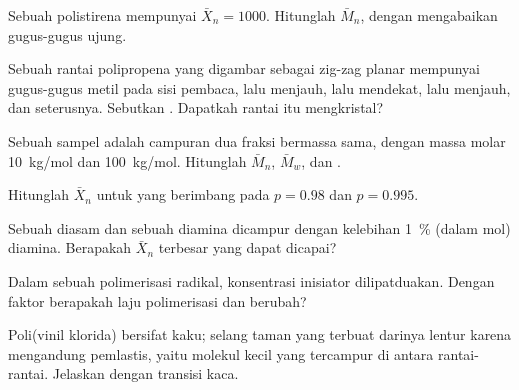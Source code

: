 \begin{exercise}[$\star$]\label{exo:b2:polymer-synthesis:3}
Sebuah polistirena mempunyai $\bar X_n = 1000$. Hitunglah $\bar M_n$, dengan mengabaikan gugus-gugus ujung.
\end{exercise}

\begin{exercise}[$\star$]\label{exo:b2:polymer-synthesis:4}
Sebuah rantai polipropena yang digambar sebagai zig-zag planar mempunyai
gugus-gugus metil pada sisi pembaca, lalu menjauh, lalu mendekat, lalu
menjauh, dan seterusnya. Sebutkan . Dapatkah rantai itu
mengkristal?
\end{exercise}

\begin{exercise}[$\star\star$]\label{exo:b2:polymer-synthesis:5}
Sebuah sampel adalah campuran dua fraksi bermassa sama, dengan massa molar
\qty{10}{kg/mol} dan
\qty{100}{kg/mol}. Hitunglah $\bar M_n$, $\bar M_w$, dan .
\end{exercise}

\begin{exercise}[$\star\star$]\label{exo:b2:polymer-synthesis:6}
Hitunglah $\bar X_n$ untuk  yang berimbang pada $p = 0.98$ dan $p = 0.995$.
\end{exercise}

\begin{exercise}[$\star\star$]\label{exo:b2:polymer-synthesis:7}
Sebuah diasam dan sebuah diamina dicampur dengan kelebihan 1~\% (dalam mol)
diamina. Berapakah $\bar X_n$ terbesar yang dapat dicapai?
\end{exercise}

\begin{exercise}[$\star\star$]\label{exo:b2:polymer-synthesis:8}
Dalam sebuah polimerisasi radikal, konsentrasi inisiator dilipatduakan.
Dengan faktor berapakah laju polimerisasi dan 
berubah?
\end{exercise}

\begin{exercise}[$\star\star$]\label{exo:b2:polymer-synthesis:9}
Poli(vinil klorida) bersifat kaku; selang taman yang terbuat darinya lentur
karena mengandung pemlastis, yaitu molekul kecil yang tercampur di antara
rantai-rantai. Jelaskan dengan transisi kaca.
\end{exercise}


